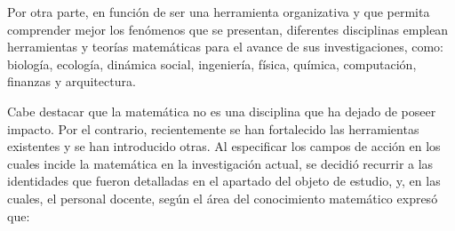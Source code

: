 Por otra parte, en función de ser una herramienta organizativa y que permita comprender mejor los fenómenos que se presentan, diferentes disciplinas emplean herramientas y teorías matemáticas para el avance de sus investigaciones, como: biología, ecología, dinámica social, ingeniería, física, química, computación, finanzas y arquitectura. 

Cabe destacar que la matemática no es una disciplina que ha dejado de poseer impacto. Por el contrario, recientemente se han fortalecido las herramientas existentes y se han introducido otras. Al especificar los campos de acción en los cuales incide la matemática en la investigación actual, se decidió recurrir a las identidades que fueron detalladas en el apartado del objeto de estudio, y, en las cuales, el personal docente, según el área del conocimiento matemático expresó que:

